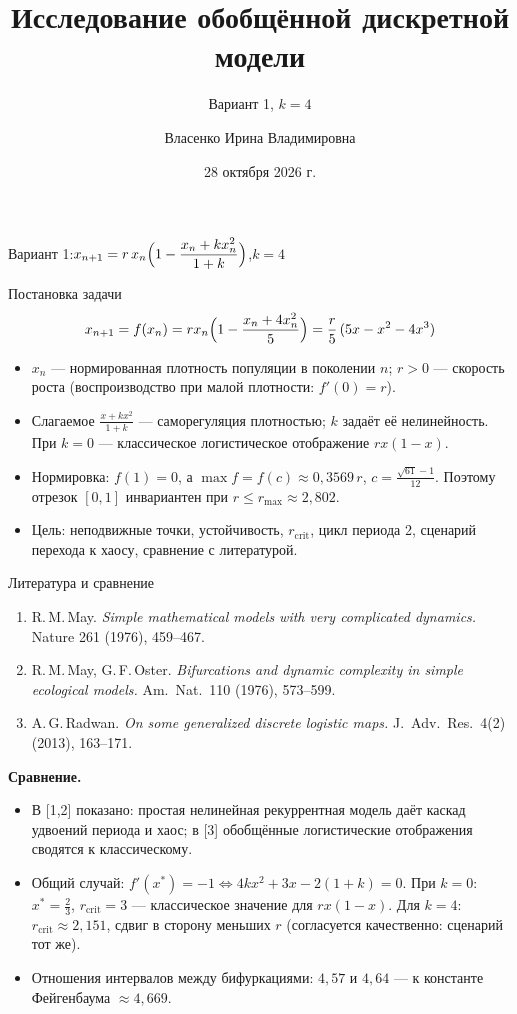 \documentclass[aspectratio=169,10pt]{beamer}
\title{Исследование обобщённой дискретной модели}
\subtitle{Вариант 1, $k=4$}
\author{Власенко Ирина Владимировна}
\institute{ИММиКН, группа ПМИ-2.2, номер в списке $k=4$}
\date{28 октября 2026 г.}
\newcommand{\rc}{r_{\mathrm{crit}}}
\begin{document}
\begin{frame}\titlepage
\begin{center}\small Вариант 1:\quad $x_{n+1}=r\,x_n\Bigl(1-\dfrac{x_n+k x_n^2}{1+k}\Bigr)$,\quad $k=4$\end{center}
\end{frame}

\begin{frame}{Постановка задачи}
\begin{equation*}x_{n+1}=f(x_n)=r x_n\Bigl(1-\frac{x_n+4x_n^2}{5}\Bigr)=\frac r5\,(5x-x^2-4x^3)\end{equation*}
\begin{itemize}
\item $x_n$ --- нормированная плотность популяции в поколении $n$; $r>0$ --- скорость роста (воспроизводство при малой плотности: $f'(0)=r$).
\item Слагаемое $\frac{x+kx^2}{1+k}$ --- саморегуляция плотностью; $k$ задаёт её нелинейность. При $k=0$ --- классическое логистическое отображение $rx(1-x)$.
\item Нормировка: $f(1)=0$, а $\max f=f(c)\approx0{,}3569\,r$, $c=\frac{\sqrt{61}-1}{12}$. Поэтому отрезок $[0,1]$ инвариантен при $r\le r_{\max}\approx2{,}802$.
\item Цель: неподвижные точки, устойчивость, $\rc$, цикл периода 2, сценарий перехода к хаосу, сравнение с литературой.
\end{itemize}
\end{frame}

\begin{frame}{Литература и сравнение}
\small
\begin{enumerate}
\item R.\,M.\,May. \emph{Simple mathematical models with very complicated dynamics.} Nature 261 (1976), 459--467.
\item R.\,M.\,May, G.\,F.\,Oster. \emph{Bifurcations and dynamic complexity in simple ecological models.} Am.\ Nat.\ 110 (1976), 573--599.
\item A.\,G.\,Radwan. \emph{On some generalized discrete logistic maps.} J.\ Adv.\ Res.\ 4(2) (2013), 163--171.
\end{enumerate}
\textbf{Сравнение.}
\begin{itemize}
\item В [1,2] показано: простая нелинейная рекуррентная модель даёт каскад удвоений периода и хаос; в [3] обобщённые логистические отображения сводятся к классическому.
\item Общий случай: $f'(x^*)=-1\iff 4kx^2+3x-2(1+k)=0$. При $k=0$: $x^*=\frac23$, $\rc=3$ --- классическое значение для $rx(1-x)$. Для $k=4$: $\rc\approx2{,}151$, сдвиг в сторону меньших $r$ (согласуется качественно: сценарий тот же).
\item Отношения интервалов между бифуркациями: $4{,}57$ и $4{,}64$ --- к константе Фейгенбаума $\approx4{,}669$.
\end{itemize}
\end{frame}
\end{document}

